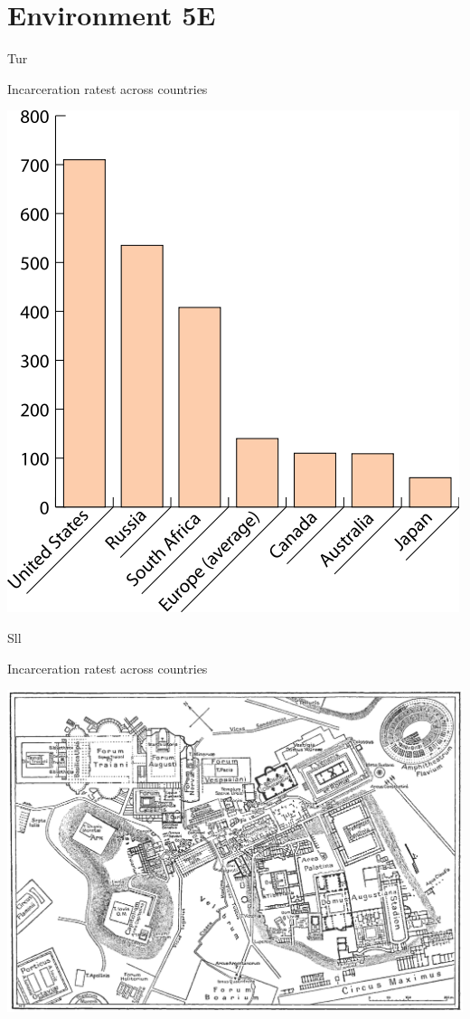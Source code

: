 \section{Environment 5E}

\lipsum[1-2]

\begin{map}{T}{ur}
\caption{Incarceration ratest across countries}
\label{chart:incarceration}
\includegraphics[width=\chartwidth,height=\chartheight]{incarceration}  
\end{map}

\begin{map}{S}{ll}
\caption{Incarceration ratest across countries}
\label{chart:incarceration}
\includegraphics[width=\chartwidth,height=\chartheight]{Rome}  
\end{map}

